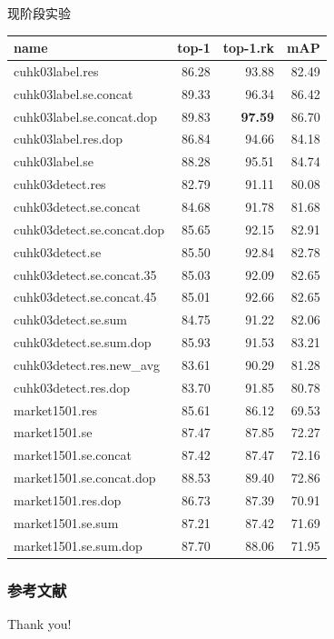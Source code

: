 \documentclass[notes]{beamer}
\newcommand{\chuhao}{\fontsize{44.9pt}{\baselineskip}\selectfont}
\begin{document}
\begin{frame}{现阶段实验}
	\begin{table}
		\begin{tabular}{lrrr}
			\toprule
			{name} &  top-1 &  top-1.rk &    mAP \\
			\midrule
			cuhk03label.res             &  86.28 &     93.88 &  82.49 \\
			cuhk03label.se.concat       &  89.33 &     96.34 &  86.42 \\
			cuhk03label.se.concat.dop   &  89.83 &     \textbf{97.59} &  86.70 \\
			cuhk03label.res.dop         &  86.84 &     94.66 &  84.18 \\
			cuhk03label.se              &  88.28 &     95.51 &  84.74 \\
			cuhk03detect.res            &  82.79 &     91.11 &  80.08 \\
			cuhk03detect.se.concat      &  84.68 &     91.78 &  81.68 \\
			cuhk03detect.se.concat.dop  &  85.65 &     92.15 &  82.91 \\
			cuhk03detect.se             &  85.50 &     92.84 &  82.78 \\
			cuhk03detect.se.concat.35   &  85.03 &     92.09 &  82.65 \\
			cuhk03detect.se.concat.45   &  85.01 &     92.66 &  82.65 \\
			cuhk03detect.se.sum         &  84.75 &     91.22 &  82.06 \\
			cuhk03detect.se.sum.dop     &  85.93 &     91.53 &  83.21 \\
			cuhk03detect.res.new\_avg    &  83.61 &     90.29 &  81.28 \\
			cuhk03detect.res.dop        &  83.70 &     91.85 &  80.78 \\			
			market1501.res              &  85.61 &     86.12 &  69.53 \\
			market1501.se               &  87.47 &     87.85 &  72.27 \\
			market1501.se.concat        &  87.42 &     87.47 &  72.16 \\
			market1501.se.concat.dop    &  88.53 &     89.40 &  72.86 \\
			market1501.res.dop          &  86.73 &     87.39 &  70.91 \\
			market1501.se.sum           &  87.21 &     87.42 &  71.69 \\
			market1501.se.sum.dop       &  87.70 &     88.06 &  71.95 \\
			\bottomrule
			\end{tabular}
	\end{table}
\end{frame}


\begin{frame}[t, allowframebreaks]

\frametitle{参考文献}


\printbibliography
\end{frame}

\begin{frame}
	\chuhao Thank you! %
\end{frame}
\end{document}
